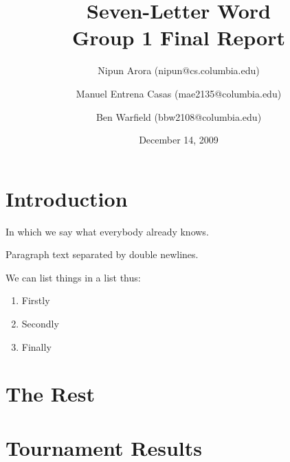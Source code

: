 \documentclass[11pt]{article}
\begin{document}
\title{Seven-Letter Word\\Group 1 Final Report}

\author{
	Nipun Arora (nipun@cs.columbia.edu)
 \and Manuel Entrena Casas (mae2135@columbia.edu)
 \and Ben Warfield (bbw2108@columbia.edu)}

\date{December 14, 2009}
\maketitle

\newpage
\setcounter{tocdepth}{2}
\tableofcontents
\newpage

\section{ Introduction }
In which we say what everybody already knows.

Paragraph text separated by double newlines.

We can list things in a list thus:
\begin{enumerate}
\item Firstly
\item Secondly
\item Finally
\end{enumerate}
\section{The Rest}
\section{Tournament Results}
\end{document}
